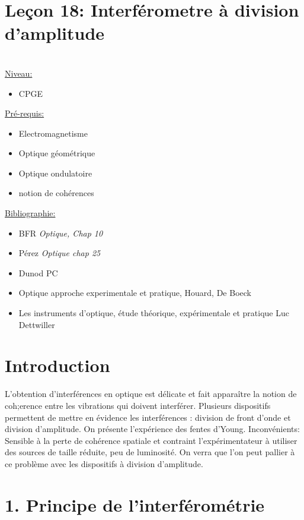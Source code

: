 \documentclass[french, a4paper, 10pt, twocolumn, landscape]{article}
\begin{document}
\section*{Leçon 18: Interférometre à division d'amplitude}

\hrulefill\\
	\underline{Niveau:}
	\begin{itemize}
		\item CPGE
	\end{itemize}
	\underline{Pré-requis:} 
	\begin{itemize}
        \item Electromagnetisme
		\item Optique géométrique
		\item Optique ondulatoire
		\item notion de cohérences
	\end{itemize}
	\underline{Bibliographie:}
	\begin{itemize}
		\item BFR \textit{Optique, Chap 10}
		\item Pérez \textit{Optique chap 25}
		\item Dunod PC
		\item Optique approche experimentale et pratique, Houard, De Boeck
		\item Les instruments d'optique, étude théorique, expérimentale et pratique Luc Dettwiller
    \end{itemize}
\hrulefill


\section*{Introduction}

L'obtention d'interférences en optique est délicate et fait apparaître la notion de coh;erence entre les vibrations qui doivent interférer. Plusieurs dispositifs permettent de mettre en évidence les interférences : division de front d'onde et division d'amplitude. On présente l'expérience des fentes d'Young.
Inconvénients: Sensible à la perte de cohérence spatiale et contraint l'expérimentateur à utiliser des sources de taille réduite, peu de luminosité. On verra que l'on peut pallier à ce problème avec les dispositifs à division d'amplitude. 

\section*{1. Principe de l'interférométrie}
\end{document}
